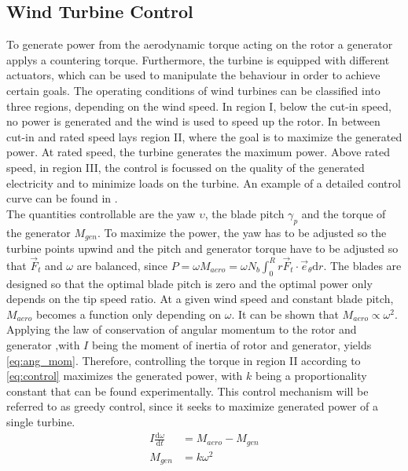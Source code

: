 \subsection{Wind Turbine Control}
To generate power from the aerodynamic torque acting on the rotor a generator applys a countering torque. Furthermore, the turbine is equipped with different actuators, which can be used to manipulate the behaviour in order to achieve certain goals. The operating conditions of wind turbines can be classified into three regions, depending on the wind speed. In region I, below the cut-in speed, no power is generated and the wind is used to speed up the rotor. In between cut-in and rated speed lays region II, where the goal is to maximize the generated power. At rated speed, the turbine generates the maximum power. Above rated speed, in region III, the control is focussed on the quality of the generated electricity and to minimize loads on the turbine. An example of a detailed control curve can be found in \cite{jonkman_definition_2009}. \cite{boersma_tutorial_2017} \\
 The quantities controllable are the yaw $\upsilon$, the blade pitch $\gamma_p$ and the torque of the generator $M_{gen}$. To maximize the power, the yaw has to be adjusted so the turbine points upwind and the pitch and generator torque have to be adjusted so that $\vec{F}_t$ and $\omega$ are balanced, since $P = \omega M_{aero} = \omega N_b \int_0^Rr\vec{F}_t \cdot \vec{e}_\theta \mathrm{d}r$. The blades are designed so that the optimal blade pitch is zero and the optimal power only depends on the tip speed ratio. At a given wind speed and constant blade pitch, $M_{aero}$ becomes a function only depending on $\omega$. It can be shown that $M_{aero} \propto \omega^2$. Applying the law of conservation of angular momentum to the rotor and generator ,with $I$ being the moment of inertia of rotor and generator, yields \eqref{eq:ang_mom}. Therefore, controlling the torque in region II according to \eqref{eq:control} maximizes the generated power, with $k$ being a proportionality constant that can be found experimentally. This control mechanism will be referred to as greedy control, since it seeks to maximize generated power of a single turbine. \cite[p.63 - 77]{hansen_aerodynamics_2008}
\begin{align}
	I\frac{\mathrm{d}\omega}{\mathrm{d}t} &= M_{aero} - M_{gen} \label{eq:ang_mom} \\
	M_{gen} &= k \omega^2 \label{eq:control} 
\end{align}
